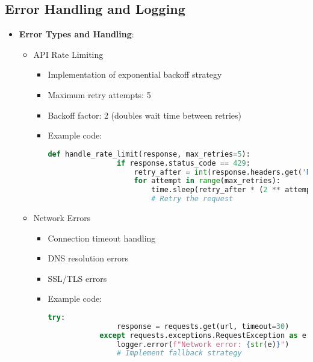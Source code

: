 \documentclass[12pt]{article}
\begin{document}
\subsection{Error Handling and Logging}
\begin{itemize}
    \item \textbf{Error Types and Handling}:
    \begin{itemize}
        \item API Rate Limiting
        \begin{itemize}
            \item Implementation of exponential backoff strategy
            \item Maximum retry attempts: 5
            \item Backoff factor: 2 (doubles wait time between retries)
            \item Example code:
            \begin{lstlisting}[language=Python]
            def handle_rate_limit(response, max_retries=5):
                if response.status_code == 429:
                    retry_after = int(response.headers.get('Retry-After', 60))
                    for attempt in range(max_retries):
                        time.sleep(retry_after * (2 ** attempt))
                        # Retry the request
            \end{lstlisting}
        \end{itemize}
        
        \item Network Errors
        \begin{itemize}
            \item Connection timeout handling
            \item DNS resolution errors
            \item SSL/TLS errors
            \item Example code:
            \begin{lstlisting}[language=Python]
            try:
                response = requests.get(url, timeout=30)
            except requests.exceptions.RequestException as e:
                logger.error(f"Network error: {str(e)}")
                # Implement fallback strategy
            \end{lstlisting}
        \end{itemize}
        

\end{itemize}
\end{itemize}
\end{document}
